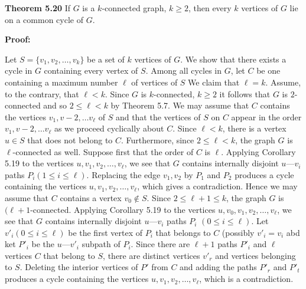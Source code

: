 \nopagenumbers
{\bf Theorem 5.20}
\vskip 6pt
If $G$ is a $k$-connected graph, $k \geq 2$, then every $k$ vertices of $G$ lie on a common cycle of $G$.

\vskip 10pt
{\bf Proof:}
\vskip 6pt

Let $S= \lbrace v_1,v_2, \ldots ,v_k \rbrace$ be a set of $k$ vertices of $G$. We show that there exists a cycle in $G$ containing every vertex of $S$. Among all cycles in $G$, let $C$ be one containing a maximum number $\ell$ of vertices of $S$ We claim that $\ell =k$. Assume, to the contrary, that $\ell < k$. Since $G$ is $k$-connected, $k \geq 2$ it follows that $G$ is $2$-connected and so $2 \leq \ell < k$ by Theorem 5.7. We may assume that $C$ contains the vertices $v_1,v-2, \ldots v_{\ell}$ of $S$ and that the vertices of $S$ on $C$ appear in the order $v_1,v-2, \ldots v_{\ell}$ as we proceed cyclically about $C$.
\vskip 1mm
Since $\ell < k$, there is a vertex $u \in S$ that does not belong to $C$. Furthermore, since $2 \leq \ell < k$, the graph $G$ is $\ell$-connected as well. Suppose first that the order of $C$ is $\ell$. Applying Corollary 5.19 to the vertices $u,v_1,v_2, \ldots ,v_{\ell}$, we see that $G$ contains internally disjoint $u$---$v_i$ paths $P_i(1 \leq i \leq \ell)$. Replacing the edge $v_1,v_2$ by $P_1$ and $P_2$ produces a cycle containing the vertices $u,v_1,v_2, \ldots ,v_{\ell}$, which gives a contradiction.
\vskip 1mm
Hence we may assume that $C$ contains a vertex $v_0 \not\in S$. Since $2 \leq \ell +1 \leq k$, the graph $G$ is $(\ell +1$-connected. Applying Corollary 5.19 to the vertices $u,v_0,v_1,v_2, \ldots ,v_{\ell}$, we see that $G$ contains internally disjoint $u$---$v_i$ paths $P_i$ $(0 \leq i \leq \ell)$. Let $v'_i(0 \leq i \leq \ell)$ be the first vertex of $P_i$ that belongs to $C$ (possibly $v'_i=v_i$ abd ket $P'_i$ be the $u$---$v'_i$ subpath of $P_i$. Since there are $\ell +1$ paths $P'_i$ and $\ell$ vertices $C$ that belong to $S$, there are distinct vertices $v'_r$ and vertices belonging to $S$. Deleting the interior vertices of $P'$ from $C$ and adding the paths $P'_r$ and $P'_t$ produces a cycle containing the vertices $u,v_1,v_2, \ldots ,v_{\ell}$, which is a contradiction.

\vfill\eject

